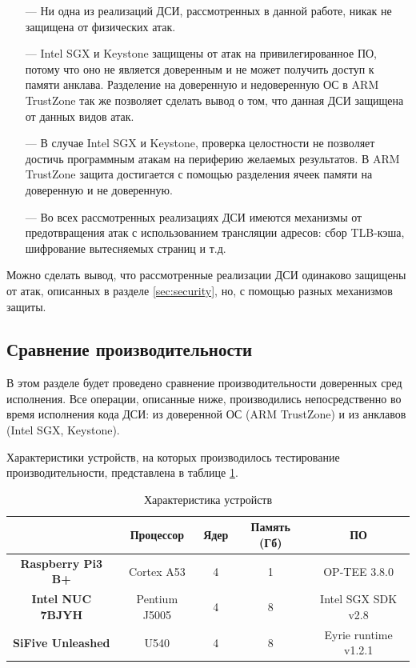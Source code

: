 \begin{itemize}
	\item [---] Ни одна из реализаций ДСИ, рассмотренных в данной работе, никак не защищена от физических атак.
	\item [---] Intel SGX и Keystone защищены от атак на привилегированное ПО, потому что оно не является доверенным и не может получить доступ к памяти анклава. Разделение на доверенную и недоверенную ОС в ARM TrustZone так же позволяет сделать вывод о том, что данная ДСИ защищена от данных видов атак.
	\item [---] В случае Intel SGX и Keystone, проверка целостности не позволяет достичь программным атакам на периферию желаемых результатов. В ARM TrustZone защита достигается с помощью разделения ячеек памяти на доверенную и не доверенную.
	\item [---] Во всех рассмотренных реализациях ДСИ имеются механизмы от предотвращения атак с использованием трансляции адресов: сбор TLB-кэша, шифрование вытесняемых страниц и т.д.
\end{itemize}

Можно сделать вывод, что рассмотренные реализации ДСИ одинаково защищены от атак, описанных в разделе \ref{sec:security}, но, с помощью разных механизмов защиты.

\subsection{Сравнение производительности}

В этом разделе будет проведено сравнение производительности доверенных сред исполнения. Все операции, описанные ниже, производились непосредственно во время исполнения кода ДСИ: из доверенной ОС (ARM TrustZone) и из анклавов (Intel SGX, Keystone).

Характеристики устройств, на которых производилось тестирование производительности, представлена в таблице \ref{table:perf-devices}.

\begin{table}[!htb]
	\begin{center}
		\caption{Характеристика устройств}
		\label{table:perf-devices}
		\begin{tabular}{|c|c|c|c|c|}
			\hline
			& \bfseries Процессор & \bfseries Ядер & \bfseries Память (Гб) & \bfseries ПО \\
			\hline
			\bfseries Raspberry Pi3 B+ & Cortex A53 & 4 & 1 & OP-TEE 3.8.0\\ \hline
			\bfseries Intel NUC 7BJYH & Pentium J5005 & 4 & 8 & Intel SGX SDK v2.8\\ \hline
			\bfseries SiFive Unleashed & U540 & 4 & 8 & Eyrie runtime v1.2.1\\ \hline
		\end{tabular}
	\end{center}
\end{table}

